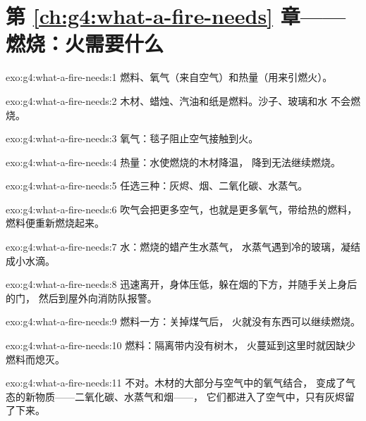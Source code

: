 \section*{第 \ref{ch:g4:what-a-fire-needs} 章——燃烧：火需要什么}

\begin{solution}{exo:g4:what-a-fire-needs:1}
燃料、氧气（来自空气）和热量（用来引燃火）。
\end{solution}

\begin{solution}{exo:g4:what-a-fire-needs:2}
木材、蜡烛、汽油和纸是燃料。沙子、玻璃和水
不会燃烧。
\end{solution}

\begin{solution}{exo:g4:what-a-fire-needs:3}
氧气：毯子阻止空气接触到火。
\end{solution}

\begin{solution}{exo:g4:what-a-fire-needs:4}
热量：水使燃烧的木材降温，
降到无法继续燃烧。
\end{solution}

\begin{solution}{exo:g4:what-a-fire-needs:5}
任选三种：灰烬、烟、二氧化碳、水蒸气。
\end{solution}

\begin{solution}{exo:g4:what-a-fire-needs:6}
吹气会把更多空气，也就是更多氧气，带给热的燃料，
燃料便重新燃烧起来。
\end{solution}

\begin{solution}{exo:g4:what-a-fire-needs:7}
水：燃烧的蜡产生水蒸气，
水蒸气遇到冷的玻璃，凝结成小水滴。
\end{solution}

\begin{solution}{exo:g4:what-a-fire-needs:8}
迅速离开，身体压低，躲在烟的下方，并随手关上身后的门，
然后到屋外向消防队报警。
\end{solution}

\begin{solution}{exo:g4:what-a-fire-needs:9}
燃料一方：关掉煤气后，
火就没有东西可以继续燃烧。
\end{solution}

\begin{solution}{exo:g4:what-a-fire-needs:10}
燃料：隔离带内没有树木，
火蔓延到这里时就因缺少燃料而熄灭。
\end{solution}

\begin{solution}{exo:g4:what-a-fire-needs:11}
不对。木材的大部分与空气中的氧气结合，
变成了气态的新物质——二氧化碳、水蒸气和烟——，
它们都进入了空气中，只有灰烬留了下来。
\end{solution}
